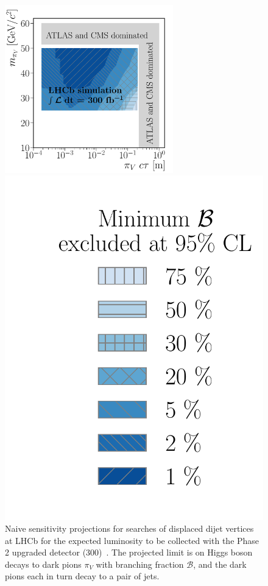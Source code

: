 \begin{figure}[t]
  \includegraphics[width=0.65\textwidth]{figures/LLP_compare_PIV_4_HL.pdf}
  \begin{minipage}[t]{0.26\textwidth}
  \vspace{-6.cm}
  \hspace{-0.7cm}
  \includegraphics[width=1.2\textwidth]{figures/LLP_compare_legend.pdf}
  \end{minipage}
  \caption{Naive sensitivity projections for searches of displaced dijet vertices at LHCb for the expected luminosity to be collected with the Phase 2 upgraded detector (300\invfb)~\cite{LHCb-CONF-2018-006}. The projected limit is on Higgs boson decays to dark pions $\pi_V$ with branching fraction $\mathcal{B}$, and the dark pions each in turn decay to a pair of jets.
}
  \label{fig:dvsearches_hllhc}
\end{figure}

